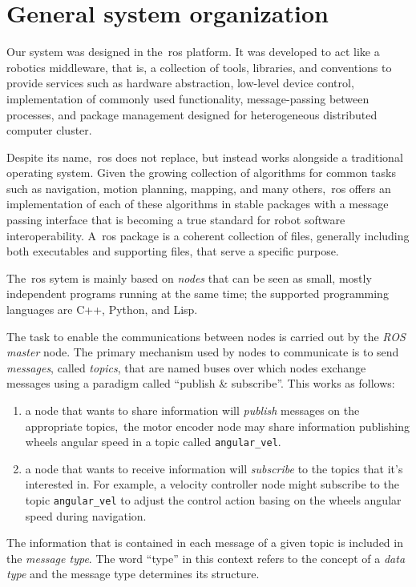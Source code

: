 \section{General system organization}
Our system was designed in the~\gls{ros} platform. It was developed to act like a robotics middleware, that is, a collection of tools, libraries, and conventions to provide services such as hardware abstraction, low-level device control, implementation of commonly used functionality, message-passing between processes, and package management designed for heterogeneous distributed computer cluster. 

Despite its name,~\gls{ros} does not replace, but instead works alongside a traditional operating system. Given the growing collection of algorithms for common tasks such as navigation, motion planning, mapping, and many others,~\gls{ros} offers an implementation of each of these algorithms in stable packages with a message passing interface that is becoming a true standard for robot software interoperability. A~\gls{ros} package is a coherent collection of files, generally including both executables and supporting files, that serve a specific purpose.

The~\gls{ros} sytem is mainly based on \textit{nodes} that can be seen as small, mostly independent programs running at the same time; the supported programming languages are C++, Python, and Lisp. 

The task to enable the communications between nodes is carried out by the \textit{ROS master} node. The primary mechanism used by nodes to communicate is to send \textit{messages}, called \textit{topics}, that are named buses over which nodes exchange messages using a paradigm called ``publish \& subscribe''. This works as follows:

\begin{enumerate}
	\item a node that wants to share information will \emph{publish} messages on the appropriate topics,~\eg the motor encoder node may share information publishing wheels angular speed in a topic called \verb|angular_vel|. 
	\item a node that wants to receive information will \emph{subscribe} to the topics that it’s interested in. For example, a velocity controller node might subscribe to the topic \verb|angular_vel| to adjust the control action basing on the wheels angular speed during navigation.
\end{enumerate}

The information that is contained in each message of a given topic is included in the \textit{message type}. The word ``type'' in this context refers to the concept of a \textit{data type} and the message type determines its structure.

